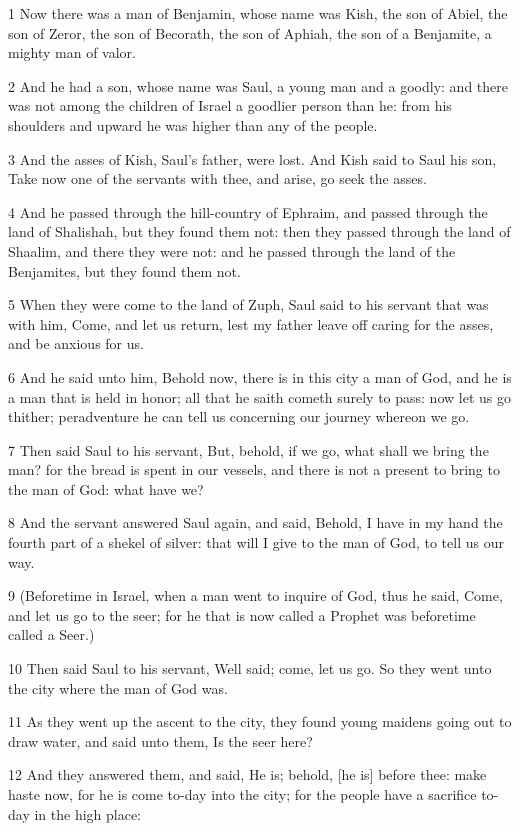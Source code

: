 \par 1 Now there was a man of Benjamin, whose name was Kish, the son of Abiel, the son of Zeror, the son of Becorath, the son of Aphiah, the son of a Benjamite, a mighty man of valor.
\par 2 And he had a son, whose name was Saul, a young man and a goodly: and there was not among the children of Israel a goodlier person than he: from his shoulders and upward he was higher than any of the people.
\par 3 And the asses of Kish, Saul's father, were lost. And Kish said to Saul his son, Take now one of the servants with thee, and arise, go seek the asses.
\par 4 And he passed through the hill-country of Ephraim, and passed through the land of Shalishah, but they found them not: then they passed through the land of Shaalim, and there they were not: and he passed through the land of the Benjamites, but they found them not.
\par 5 When they were come to the land of Zuph, Saul said to his servant that was with him, Come, and let us return, lest my father leave off caring for the asses, and be anxious for us.
\par 6 And he said unto him, Behold now, there is in this city a man of God, and he is a man that is held in honor; all that he saith cometh surely to pass: now let us go thither; peradventure he can tell us concerning our journey whereon we go.
\par 7 Then said Saul to his servant, But, behold, if we go, what shall we bring the man? for the bread is spent in our vessels, and there is not a present to bring to the man of God: what have we?
\par 8 And the servant answered Saul again, and said, Behold, I have in my hand the fourth part of a shekel of silver: that will I give to the man of God, to tell us our way.
\par 9 (Beforetime in Israel, when a man went to inquire of God, thus he said, Come, and let us go to the seer; for he that is now called a Prophet was beforetime called a Seer.)
\par 10 Then said Saul to his servant, Well said; come, let us go. So they went unto the city where the man of God was.
\par 11 As they went up the ascent to the city, they found young maidens going out to draw water, and said unto them, Is the seer here?
\par 12 And they answered them, and said, He is; behold, [he is] before thee: make haste now, for he is come to-day into the city; for the people have a sacrifice to-day in the high place:
